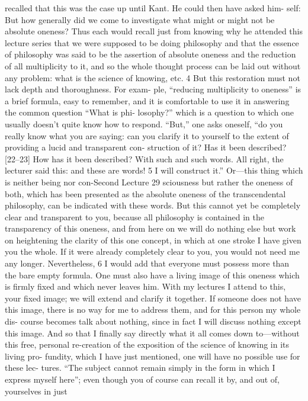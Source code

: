 recalled that this was the case up until Kant. He could then have asked him-
self: But how generally did we come to investigate what might or might not
be absolute oneness? Thus each would recall just from knowing why he
attended this lecture series that we were supposed to be doing philosophy and
that the essence of philosophy was said to be the assertion of absolute oneness
and the reduction of all multiplicity to it, and so the whole thought process
can be laid out without any problem: what is the science of knowing, etc. 4
But this restoration must not lack depth and thoroughness. For exam-
ple, “reducing multiplicity to oneness” is a brief formula, easy to remember, and
it is comfortable to use it in answering the common question “What is phi-
losophy?” which is a question to which one usually doesn’t quite know how to
respond. “But,” one asks oneself, “do you really know what you are saying: can
you clarify it to yourself to the extent of providing a lucid and transparent con-
struction of it? Has it been described? [22–23] How has it been described?
With such and such words. All right, the lecturer said this: and these are
words! 5 I will construct it.” Or—this thing which is neither being nor con-Second Lecture
29
sciousness but rather the oneness of both, which has been presented as the
absolute oneness of the transcendental philosophy, can be indicated with these
words. But this cannot yet be completely clear and transparent to you, because
all philosophy is contained in the transparency of this oneness, and from here
on we will do nothing else but work on heightening the clarity of this one
concept, in which at one stroke I have given you the whole. If it were already
completely clear to you, you would not need me any longer. Nevertheless, 6 I
would add that everyone must possess more than the bare empty formula.
One must also have a living image of this oneness which is firmly fixed and
which never leaves him. With my lectures I attend to this, your fixed image;
we will extend and clarify it together. If someone does not have this image,
there is no way for me to address them, and for this person my whole dis-
course becomes talk about nothing, since in fact I will discuss nothing except
this image.
And so that I finally say directly what it all comes down to—without this
free, personal re-creation of the exposition of the science of knowing in its living pro-
fundity, which I have just mentioned, one will have no possible use for these lec-
tures. “The subject cannot remain simply in the form in which I express myself
here”; even though you of course can recall it by, and out of, yourselves in just
